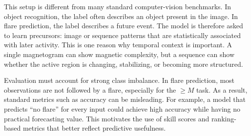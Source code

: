 This setup is different from many standard computer-vision benchmarks. In object recognition, the label often describes an object present in the image. In flare prediction, the label describes a future event. The model is therefore asked to learn precursors: image or sequence patterns that are statistically associated with later activity. This is one reason why temporal context is important. A single magnetogram can show magnetic complexity, but a sequence can show whether the active region is changing, stabilizing, or becoming more structured.



Evaluation must account for strong class imbalance. In flare prediction, most observations are not followed by a flare, especially for the $\geq M$ task. As a result, standard metrics such as accuracy can be misleading. For example, a model that predicts ``no flare'' for every input could achieve high accuracy while having no practical forecasting value. This motivates the use of skill scores and ranking-based metrics that better reflect predictive usefulness.

